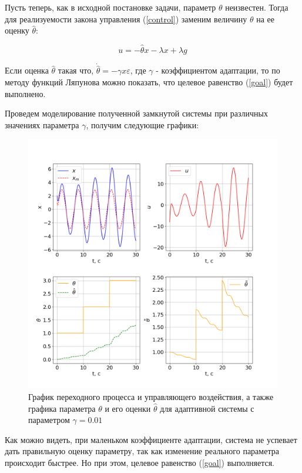 Пусть теперь, как в исходной постановке задачи, параметр $\theta$ неизвестен. Тогда для реализуемости закона управления (\ref{control}) заменим величину $\theta$ на ее оценку $\hat{\theta}$:

\begin{equation}
    u = - \hat{\theta} x - \lambda x + \lambda g
\end{equation}

Если оценка $\hat{\theta}$ такая что, $\dot{\hat{\theta}} = - \gamma x \varepsilon$, где $\gamma$ - коэффициентом адаптации, то по методу функций Ляпунова можно показать, что целевое равенство (\ref{goal}) будет выполнено.

Проведем моделирование полученной замкнутой системы при различных значениях параметра $\gamma$, получим следующие графики:

\begin{figure}
    \centerline{\includegraphics[width=\linewidth]{images/task_2_0.01.png}}
    \caption{График переходного процесса и управляющего воздействия, а также графика параметра $\theta$ и его оценки $\hat{\theta}$ для адаптивной системы с параметром $\gamma = 0.01$}
    \label{21}
\end{figure}

Как можно видеть, при маленьком коэффициенте адаптации, система не успевает дать правильную оценку параметру, так как изменение реального параметра происходит быстрее. Но при этом, целевое равенство (\ref{goal}) выполняется.

